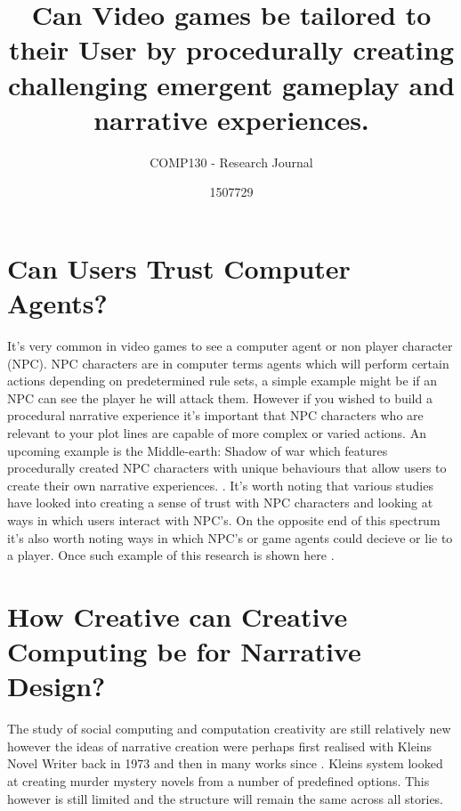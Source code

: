 \documentclass{scrartcl}
\title{Can Video games be tailored to their User by procedurally creating challenging emergent gameplay and narrative experiences.}
\subtitle{COMP130 - Research Journal}
\author{1507729}
\begin{document}
\maketitle

\abstract{}

\section{Can Users Trust Computer Agents?}

It's very common in video games to see a computer agent or non player character (NPC). NPC characters are in computer terms agents which will perform certain actions depending on predetermined rule sets, a simple example might be if an NPC can see the player he will attack them. However if you wished to build a procedural narrative experience it's important that NPC characters who are relevant to your plot lines are capable of more complex or varied actions. An upcoming example is the Middle-earth: Shadow of war which features procedurally created NPC characters with unique behaviours that allow users to create their own narrative experiences. \cite{monolith2017shadow}. It's worth noting that various studies have looked into creating a sense of trust with NPC characters and looking at ways in which users interact with NPC's. \cite{do2016trust} On the opposite end of this spectrum it's also worth noting ways in which NPC's or game agents could decieve or lie to a player. Once such example of this research is shown here \cite{cowling2015emergent}.

\section{How Creative can Creative Computing be for Narrative Design?}

The study of social computing and computation creativity are still relatively new however the ideas of narrative creation were perhaps first realised with Kleins Novel Writer \cite{klein1973automatic} back in 1973 and then in many works since \cite{gervas2009storytelling}. Kleins system looked at creating murder mystery novels from a number of predefined options. This however is still limited and the structure will remain the same across all stories. 




\end{document}
